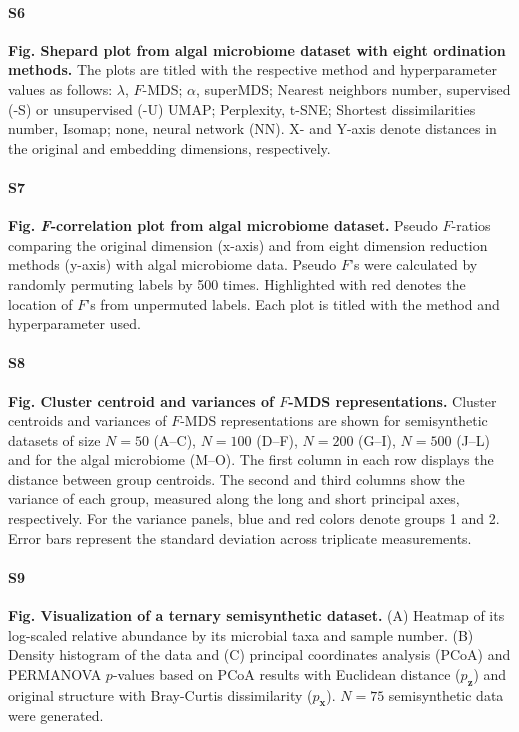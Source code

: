 \documentclass[10pt,letterpaper]{article}
\newcommand{\1}{{\rm 1}\kern-0.24em{\rm I}}
\begin{document}
\paragraph*{S6}\hspace{-2ex}
\label{fig:shepard_alga_all}
\textbf{Fig. Shepard plot from algal microbiome dataset with eight ordination methods.} The plots are titled with the respective method and hyperparameter values as follows: $\lambda$, $F$-MDS; $\alpha$, superMDS; Nearest neighbors number, supervised (-S) or unsupervised (-U) UMAP; Perplexity, t-SNE; Shortest dissimilarities number, Isomap; none, neural network (NN). X- and Y-axis denote distances in the original and embedding dimensions, respectively.

\paragraph*{S7}\hspace{-2ex}
\label{fig:f_corr_alga_all}
\textbf{Fig. \textit{F}-correlation plot from algal microbiome dataset.} Pseudo $F$-ratios comparing the original dimension (x-axis) and from eight dimension reduction methods (y-axis) with algal microbiome data. Pseudo $F$'s were calculated by randomly permuting labels by 500 times. Highlighted with red denotes the location of $F$'s from unpermuted labels. Each plot is titled with the method and hyperparameter used.

\paragraph*{S8}\hspace{-2ex}
\label{fig:fmds_rep_analysis}
\textbf{Fig. Cluster centroid and variances of $F$-MDS representations.} Cluster centroids and variances of $F$-MDS representations are shown for semisynthetic datasets of size $N=50$ (A–C), $N=100$ (D–F), $N=200$ (G–I), $N=500$ (J–L) and for the algal microbiome (M–O). The first column in each row displays the distance between group centroids. The second and third columns show the variance of each group, measured along the long and short principal axes, respectively. For the variance panels, blue and red colors denote groups 1 and 2. Error bars represent the standard deviation across triplicate measurements.

\paragraph*{S9}\hspace{-2ex}
\label{fig:sim_ternary_vis}
\textbf{Fig. Visualization of a ternary semisynthetic dataset.} (A) Heatmap of its log-scaled relative abundance by its microbial taxa and sample number. (B) Density histogram of the data and (C) principal coordinates analysis (PCoA) and PERMANOVA $p$-values based on PCoA results with Euclidean distance ($p_\mathbf{z}$) and original structure with Bray-Curtis dissimilarity ($p_\mathbf{x}$). $N=75$ semisynthetic data were generated.
\end{document}
